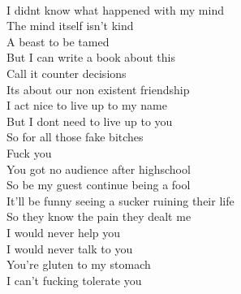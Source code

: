 \documentclass[12pt, b5paper, oneside]{book}
\begin{document}
\\I didnt know what happened with my mind
\\The mind itself isn't kind
\\A beast to be tamed
\\But I can write a book about this
\\Call it counter decisions
\\Its about our non existent friendship
\\I act nice to live up to my name
\\But I dont need to live up to you
\\So for all those fake bitches
\\Fuck you
\\You got no audience after highschool
\\So be my guest continue being a fool
\\It'll be funny seeing a sucker ruining their life
\\So they know the pain they dealt me
\\I would never help you
\\I would never talk to you
\\You're gluten to my stomach
\\I can't fucking tolerate you

\newpage 
\end{document}
